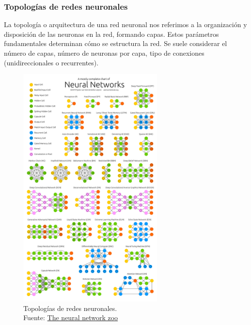 

\clearpage
\subsubsection{Topologías de redes neuronales}
La topología o arquitectura de una red neuronal nos referimos a la organización y disposición de las neuronas en la red, formando capas. Estos parámetros fundamentales determinan cómo se estructura la red.
Se suele considerar el número de capas, número de neuronas por capa, tipo de conexiones (unidireccionales o recurrentes).


\begin{figure}[H]
    \centering
    \includegraphics[width=0.65\textwidth]{figures/NeuralNetworkZo19High.png}
    \caption{Topologías de redes neuronales.\\Fuente: \href{https://www.asimovinstitute.org/neural-network-zoo/}{The neural network zoo}}
    \label{fig:NeuralNetworkZo19High}
\end{figure}



